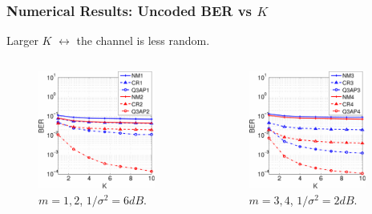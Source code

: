 \documentclass{beamer}
\begin{document}
\begin{frame}
  \frametitle{Numerical Results: Uncoded BER vs $K$}
  Larger $K$ $\leftrightarrow$ the channel is less random.
  \begin{columns}
    \begin{figure}
      \includegraphics[width=0.9\textwidth]{figs/BER_K_MonteCarlo_64QAM_6.pdf}
      \caption{$m=1,2$, $1/\sigma^2 = 6dB$.}
    \end{figure}
    
    \begin{figure}
      \includegraphics[width=0.9\textwidth]{figs/BER_K_MonteCarlo_64QAM_2.pdf}
      \caption{$m=3,4$, $1/\sigma^2 = 2dB$.}
    \end{figure}
  \end{columns}
\end{frame}
\end{document}

